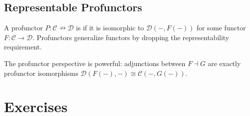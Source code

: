 \subsection{Representable Profunctors}

A profunctor $P : \mathcal{C} \nrightarrow \mathcal{D}$ is 
if it is isomorphic to $\mathcal{D}(-, F(-))$ for some functor
$F : \mathcal{C} \to \mathcal{D}$. Profunctors generalize functors by dropping
the representability requirement.

The profunctor perspective is powerful: adjunctions between $F \dashv G$ are
exactly profunctor isomorphisms $\mathcal{D}(F(-), -) \cong \mathcal{C}(-, G(-))$.

\section{Exercises}


